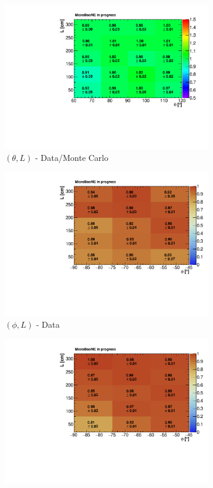 \documentclass[a4paper]{scrartcl}
\begin{document}
\begin{figure}[htbp]
\begin{subfigure}{0.33\textwidth}
\includegraphics[width=\linewidth]{figures/theta_l.pdf}
\caption{$(\theta,L)$ - Data/Monte Carlo}
\end{subfigure}
\begin{subfigure}{0.33\textwidth}
  \includegraphics[width=\linewidth]{figures/e_phi_l.pdf}
  \caption{$(\phi,L)$ - Data}
\end{subfigure}\begin{subfigure}{0.33\textwidth}
\includegraphics[width=\linewidth]{figures/phi_l_mc.pdf}

\end{subfigure}
\end{figure}
\end{document}
